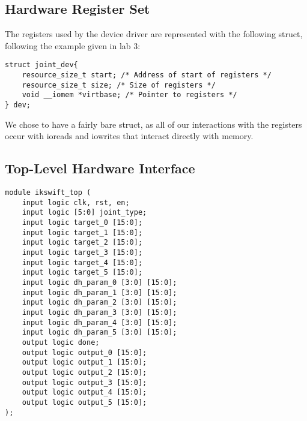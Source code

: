 \subsection{Hardware Register Set}

The registers used by the device driver are represented with the following struct, following the example given in lab 3:

\begin{verbatim}
struct joint_dev{
	resource_size_t start; /* Address of start of registers */
	resource_size_t size; /* Size of registers */
	void __iomem *virtbase; /* Pointer to registers */
} dev;
\end{verbatim}

We chose to have a fairly bare struct, as all of our interactions with the registers occur with ioreads and iowrites that interact
directly with memory.

\subsection{Top-Level Hardware Interface}

\begin{verbatim}
module ikswift_top (
	input logic clk, rst, en;
	input logic [5:0] joint_type;
	input logic target_0 [15:0];
	input logic target_1 [15:0];
	input logic target_2 [15:0];
	input logic target_3 [15:0];
	input logic target_4 [15:0];
	input logic target_5 [15:0];
	input logic dh_param_0 [3:0] [15:0];
	input logic dh_param_1 [3:0] [15:0];
	input logic dh_param_2 [3:0] [15:0];
	input logic dh_param_3 [3:0] [15:0];
	input logic dh_param_4 [3:0] [15:0];
	input logic dh_param_5 [3:0] [15:0];
	output logic done;
	output logic output_0 [15:0];
	output logic output_1 [15:0];
	output logic output_2 [15:0];
	output logic output_3 [15:0];
	output logic output_4 [15:0];
	output logic output_5 [15:0];
);
\end{verbatim}
